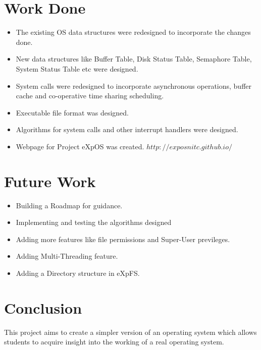 \chapter{Work Done}
\label{chap10}
\begin {itemize}
\item The existing OS data structures were redesigned to incorporate the changes done. 
\item New data structures like Buffer Table, Disk Status Table, Semaphore Table, System Status Table etc were designed.
\item System calls were redesigned to incorporate asynchronous operations, buffer cache and co-operative time sharing scheduling.
\item Executable file format was designed.
\item Algorithms for system calls and other interrupt handlers were designed.
\item Webpage for Project eXpOS was created. \texttt{$http://exposnitc.github.io/$}
\end{itemize}

\chapter{Future Work}
\label{chap11}
\begin {itemize}
\item Building a Roadmap for guidance.
\item Implementing and testing the algorithms designed
\item Adding more features like file permissions and Super-User previleges.
\item Adding Multi-Threading feature.
\item Adding a Directory structure in eXpFS.
\end{itemize}

\chapter{Conclusion}
\label{chap12}
This project aims to create a simpler version of an operating system which allows students to acquire insight into the working of a real operating system.
